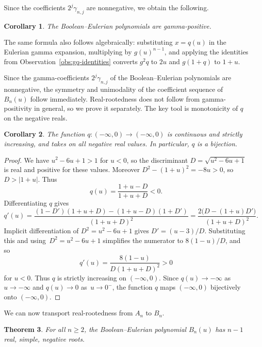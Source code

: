 \documentclass[10pt]{article}
\theoremstyle{plain}
\newtheorem{theorem}{Theorem}[section]
\newtheorem{corollary}[theorem]{Corollary}
\begin{document}
Since the coefficients $2^j \gamma_{n,j}$ are nonnegative, we obtain the following.

\begin{corollary}
\label{cor:gamma}
The Boolean--Eulerian polynomials are gamma-positive.
\end{corollary}

%
%

The same formula also follows algebraically: substituting $x = q(u)$ in the Eulerian gamma expansion, multiplying by $g(u)^{n-1}$, and applying the identities from Observation~\ref{obs:gq-identities} converts $g^2 q$ to $2u$ and $g(1+q)$ to $1+u$.

%
%

Since the gamma-coefficients $2^j \gamma_{n,j}$ of the Boolean--Eulerian polynomials are nonnegative, the symmetry and unimodality of the coefficient sequence of $B_n(u)$ follow immediately. Real-rootedness does not follow from gamma-positivity in general, so we prove it separately. The key tool is monotonicity of $q$ on the negative reals.

\begin{corollary}
\label{cor:q-properties}
The function $q\colon (-\infty, 0) \to (-\infty, 0)$ is continuous and strictly increasing, and takes on all negative real values. In particular, $q$ is a bijection.
\end{corollary}

\begin{proof}
We have $u^2 - 6u + 1 > 1$ for $u < 0$, so the discriminant $D = \sqrt{u^2 - 6u + 1}$ is real and positive for these values. Moreover $D^2 - (1+u)^2 = -8u > 0$, so $D > |1+u|$. Thus
\[
	q(u) = \frac{1+u-D}{1+u+D} < 0.
\]
Differentiating $q$ gives
\[
	q'(u) = \frac{(1-D')(1+u+D) - (1+u-D)(1+D')}{(1+u+D)^2} = \frac{2\bigl(D - (1+u)D'\bigr)}{(1+u+D)^2}.
\]
Implicit differentiation of $D^2 = u^2 - 6u + 1$ gives $D' = (u-3)/D$. Substituting this and using~${D^2 = u^2 - 6u + 1}$ simplifies the numerator to $8(1-u)/D$, and so
\[
	q'(u) = \frac{8(1-u)}{D(1+u+D)^2} > 0
\]
for $u < 0$.
Thus $q$ is strictly increasing on $(-\infty, 0)$. Since $q(u) \to -\infty$ as $u \to -\infty$ and $q(u) \to 0$ as~${u \to 0^-}$, the function $q$ maps $(-\infty, 0)$ bijectively onto $(-\infty, 0)$.
\end{proof}

We can now transport real-rootedness from $A_n$ to $B_n$.

\begin{theorem}
\label{thm:real-roots}
For all $n \geq 2$, the Boolean--Eulerian polynomial $B_n(u)$ has $n-1$ real, simple, negative roots.
\end{theorem}
\end{document}
